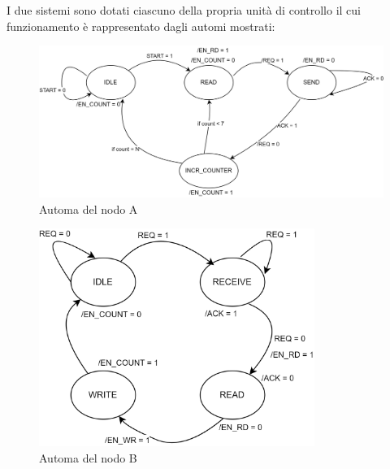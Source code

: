 I due sistemi sono dotati ciascuno della propria unità di controllo il cui funzionamento è rappresentato dagli automi mostrati:
\begin{figure}[H]
	\centering
	\includegraphics[width=1\textwidth]{img/handshaking/automa_A_handshake}
	\caption{Automa del nodo A}
	\label{test1} 
\end{figure}
\begin{figure}[H]
	\centering
	\includegraphics[width=0.8\textwidth]{img/handshaking/automa_B_handshake}
	\caption{Automa del nodo B}
	\label{test1} 
\end{figure}
